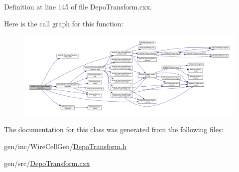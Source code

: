 Definition at line 145 of file Depo\+Transform.\+cxx.

Here is the call graph for this function\+:
\nopagebreak
\begin{figure}[H]
\begin{center}
\leavevmode
\includegraphics[width=350pt]{class_wire_cell_1_1_gen_1_1_depo_transform_a72bd0b9e256a8e9f4311c61cf6b5692b_cgraph}
\end{center}
\end{figure}


The documentation for this class was generated from the following files\+:\begin{DoxyCompactItemize}
\item 
gen/inc/\+Wire\+Cell\+Gen/\hyperlink{_depo_transform_8h}{Depo\+Transform.\+h}\item 
gen/src/\hyperlink{_depo_transform_8cxx}{Depo\+Transform.\+cxx}\end{DoxyCompactItemize}
